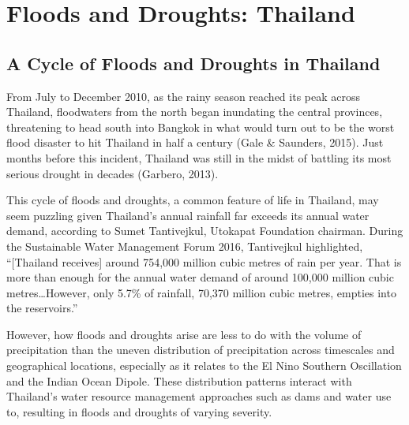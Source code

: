 \chapter{Floods and Droughts: Thailand}

\section{A Cycle of Floods and Droughts in Thailand}

From July to December 2010, as the rainy season reached its peak across Thailand, floodwaters from the north began inundating the central provinces, threatening to head south into Bangkok in what would turn out to be the worst flood disaster to hit Thailand in half a century (Gale \& Saunders, 2015). Just months before this incident, Thailand was still in the midst of battling its most serious drought in decades (Garbero, 2013). 

This cycle of floods and droughts, a common feature of life in Thailand, may seem puzzling given Thailand’s annual rainfall far exceeds its annual water demand, according to Sumet Tantivejkul, Utokapat Foundation chairman. During the Sustainable Water Management Forum 2016, Tantivejkul highlighted, ``[Thailand receives] around 754,000 million cubic metres of rain per year. That is more than enough for the annual water demand of around 100,000 million cubic metres\ldots However, only 5.7\% of rainfall, 70,370 million cubic metres, empties into the reservoirs.''

However, how floods and droughts arise are less to do with the volume of precipitation than the uneven distribution of precipitation across timescales and geographical locations, especially as it relates to the El Nino Southern Oscillation and the Indian Ocean Dipole. These distribution patterns interact with Thailand’s water resource management approaches such as dams and water use to, resulting in floods and droughts of varying severity.

